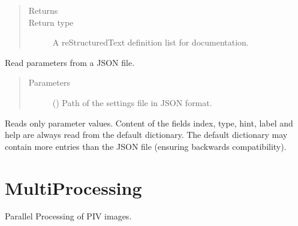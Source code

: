\documentclass[letterpaper,10pt,english]{sphinxmanual}
\begin{document}
\begin{fulllineitems}
\begin{fulllineitems}
\begin{quote}
\begin{description}
\item[{Returns}] \leavevmode
{}

\item[{Return type}] \leavevmode
A reStructuredText definition list for documentation.

\end{description}\end{quote}

\end{fulllineitems}


\begin{fulllineitems}
\label{\detokenize{openpivparams:openpivgui.OpenPivParams.OpenPivParams.load_settings}}
Read parameters from a JSON file.
\begin{quote}\begin{description}
\item[{Parameters}] \leavevmode
{} () \textendash{} Path of the settings file in JSON format.

\end{description}\end{quote}

Reads only parameter values. Content of the fields index,
type, hint, label and help are always read from the default
dictionary. The default dictionary may contain more entries
than the JSON file (ensuring backwards compatibility).

\end{fulllineitems}


\end{fulllineitems}



\section{MultiProcessing}
\label{\detokenize{multiprocessing:module-openpivgui.MultiProcessing}}\label{\detokenize{multiprocessing:multiprocessing}}\label{\detokenize{multiprocessing::doc}}
Parallel Processing of PIV images.
\end{document}
